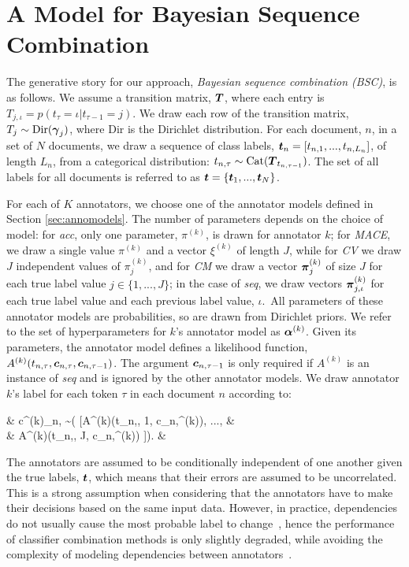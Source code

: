 \section{A Model for Bayesian Sequence Combination}\label{sec:model}

The generative story for our approach, \emph{Bayesian sequence combination (BSC)}, is as follows.
We assume a transition matrix, $\boldsymbol T$, where each entry is $T_{j,\iota} = p(t_{\tau} = \iota | t_{\tau-1} = j)$.
We draw each row of the transition matrix, $T_j \sim \mathrm{Dir}(\boldsymbol \gamma_j)$, where $\mathrm{Dir}$ is the Dirichlet distribution. 
For each document, $n$, in a set of $N$ documents, we draw a sequence of class labels, 
$\boldsymbol t_n = [t_{n,1}, ..., t_{n, L_n}]$, of length $L_n$, from a categorical distribution:
$t_{n,\tau} \sim \mathrm{Cat}(\boldsymbol T_{t_{n,\tau-1}})$. The set of all labels for all documents is referred to as $\boldsymbol t = \{\boldsymbol t_1,...,\boldsymbol t_N\}$.

For each of $K$ annotators, we choose one of the annotator 
models defined in Section \ref{sec:annomodels}.
The number of parameters depends on the choice of model:
for \emph{acc}, only one parameter, $\pi^{(k)}$, is drawn for annotator $k$;
for \emph{MACE}, we draw a single value $\pi^{(k)}$ and a vector $\xi^{(k)}$ of length $J$, 
while for \emph{CV} we draw $J$ independent values of $\pi_j^{(k)}$, 
and for \emph{CM}  
we draw a vector $\boldsymbol\pi^{(k)}_j$ of size $J$ for each true label value $j\in \{1,...,J\}$; in the case of \emph{seq}, 
we draw vectors $\boldsymbol\pi^{(k)}_{j,\iota}$ for each true label value 
and each previous label value, $\iota$.\
All parameters of these annotator models are probabilities, 
so are drawn from Dirichlet priors. We refer to the set of hyperparameters 
for $k$'s annotator model as $\boldsymbol\alpha^{(k)}$.
Given its parameters, the annotator model defines a likelihood function,
$A^{(k)}(t_{n,\tau}, \boldsymbol c_{n,\tau}, \boldsymbol c_{n,\tau-1})$.
The argument $\boldsymbol c_{n,\tau-1}$ is only required if $A^{(k)}$ is an instance
of \emph{seq} and is ignored by the other annotator models.
We draw annotator $k$'s label for each token $\tau$ in each document $n$ 
according to:
\begin{flalign}
& c^{(k)}_{n,\tau} \sim {}( [A^{(k)}(t_{n,\tau}, 1, \bs c_{n,}^{(k)}), ..., & \nonumber \\
& \hspace{3.4cm} A^{(k)}(t_{n,\tau}, J, \bs c_{n,\tau-1}^{(k)}) ]). &
\end{flalign}
The annotators are assumed to be conditionally independent of one another given the true labels,
$\boldsymbol t$, which means that their errors are assumed to be uncorrelated. This is a strong assumption
when considering that the annotators have to make their decisions based
on the same input data. However, in practice, dependencies do not usually cause the 
most probable label to change~\citep{zhang2004optimality}, hence the performance of classifier combination methods 
is only slightly degraded, while avoiding the complexity of modeling dependencies between annotators~\citep{kim2012bayesian}.

